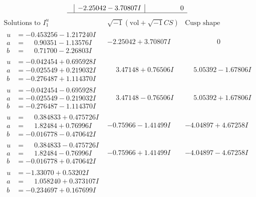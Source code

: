 \documentclass[1p]{elsarticle_modified}
\theoremstyle{definition}
\newcommand{\I}{\sqrt{-1}}
\begin{document}
$$\begin{array}{c|c|c}
 & -2.25042 - 3.70807 I & \phantom{-0.000000 } 0\\
 \hline 
 \end{array}$$\newpage$$\begin{array}{c|c|c}  
\text{Solutions to }I^u_{1}& \I (\text{vol} + \sqrt{-1}CS) & \text{Cusp shape}\\
 \hline 
\begin{aligned}
u &= -0.453256 - 1.217240 I \\
a &= \phantom{-}0.90351 - 1.13576 I \\
b &= \phantom{-}0.71700 - 2.26803 I\end{aligned}
 & -2.25042 + 3.70807 I & \phantom{-0.000000 } 0 \\ \hline\begin{aligned}
u &= -0.042454 + 0.695928 I \\
a &= -0.025549 + 0.219032 I \\
b &= -0.276487 + 1.114370 I\end{aligned}
 & \phantom{-}3.47148 + 0.76506 I & \phantom{-}5.05392 - 1.67806 I \\ \hline\begin{aligned}
u &= -0.042454 - 0.695928 I \\
a &= -0.025549 - 0.219032 I \\
b &= -0.276487 - 1.114370 I\end{aligned}
 & \phantom{-}3.47148 - 0.76506 I & \phantom{-}5.05392 + 1.67806 I \\ \hline\begin{aligned}
u &= \phantom{-}0.384833 + 0.475726 I \\
a &= \phantom{-}1.82484 + 0.76996 I \\
b &= -0.016778 - 0.470642 I\end{aligned}
 & -0.75966 - 1.41499 I & -4.04897 + 4.67258 I \\ \hline\begin{aligned}
u &= \phantom{-}0.384833 - 0.475726 I \\
a &= \phantom{-}1.82484 - 0.76996 I \\
b &= -0.016778 + 0.470642 I\end{aligned}
 & -0.75966 + 1.41499 I & -4.04897 - 4.67258 I \\ \hline\begin{aligned}
u &= -1.33070 + 0.53202 I \\
a &= \phantom{-}1.058240 + 0.373107 I \\
b &= -0.234697 + 0.167699 I\end{aligned}

\end{array}$$
\end{document}
